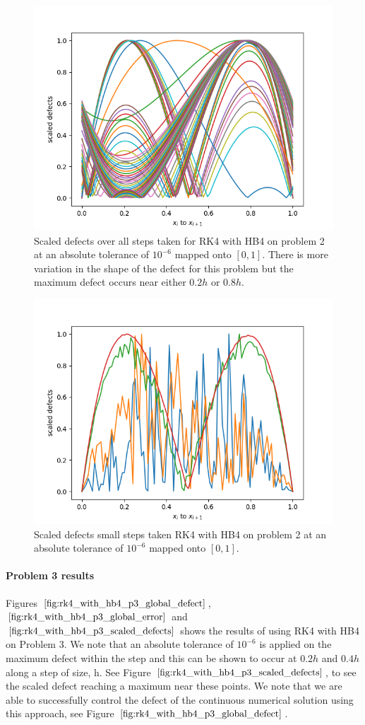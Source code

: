 \begin{figure}[H]
\centering
\includegraphics[width=0.7\linewidth]{./figures/rk4_with_hb4_p2_scaled_defects}
\caption{Scaled defects over all steps taken for RK4 with HB4 on problem 2 at an absolute tolerance of $10^{-6}$ mapped onto $[0, 1]$. There is more variation in the shape of the defect for this problem but the maximum defect occurs near either $0.2h$ or $0.8h$. }
\label{fig:rk4_with_hb4_p2_scaled_defects}
\end{figure}

\begin{figure}[H]
\centering
\includegraphics[width=0.7\linewidth]{./figures/rk4_with_hb4_p2_scaled_defects_small_steps}
\caption{Scaled defects small steps taken RK4 with HB4 on problem 2 at an absolute tolerance of $10^{-6}$ mapped onto $[0, 1]$.}
\label{fig:rk4_with_hb4_p2_scaled_defects_small_steps}
\end{figure}

\paragraph{Problem 3 results}
Figures $\ref{fig:rk4_with_hb4_p3_global_defect}$, $\ref{fig:rk4_with_hb4_p3_global_error}$ and $\ref{fig:rk4_with_hb4_p3_scaled_defects}$ shows the results of using RK4 with HB4 on Problem 3. We note that an absolute tolerance of $10^{-6}$ is applied on the maximum defect within the step and this can be shown to occur at $0.2h$ and $0.4h$ along a step of size, h. See Figure $\ref{fig:rk4_with_hb4_p3_scaled_defects}$, to see the scaled defect reaching a maximum near these points. We note that we are able to successfully control the defect of the continuous numerical solution using this approach, see Figure $\ref{fig:rk4_with_hb4_p3_global_defect}$. 

